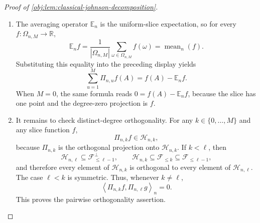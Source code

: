 \begin{proof}[Proof of \cref{obj:lem:classical-johnson-decomposition}]
\begin{enumerate}
\item The averaging operator \(\mathbb E_n\) is the uniform-slice expectation, so for every \(f:\Omega_{n,M}\to\mathbb R\),
\[
\mathbb E_n f
=
\frac{1}{|\Omega_{n,M}|}\sum_{\omega\in\Omega_{n,M}}f(\omega)
=
\operatorname{mean}_n(f).
\]
Substituting this equality into the preceding display yields
\[
\sum_{u=1}^{M}\Pi_{n,u}f(A)
=
f(A)-\mathbb E_n f .
\]
When \(M=0\), the same formula reads \(0=f(A)-\mathbb E_n f\), because the slice has one point and the degree-zero projection is \(f\). %

\item It remains to check distinct-degree orthogonality. For any \(k\in\{0,\ldots,M\}\) and any slice function \(f\),
\[
\Pi_{n,k}f\in\mathcal H_{n,k},
\]
because \(\Pi_{n,k}\) is the orthogonal projection onto \(\mathcal H_{n,k}\). If \(k<\ell\), then
\[
\mathcal H_{n,\ell}\subseteq \mathcal F_{\le \ell-1}^{\perp},
\qquad
\mathcal H_{n,k}\subseteq \mathcal F_{\le k}\subseteq \mathcal F_{\le \ell-1},
\]
and therefore every element of \(\mathcal H_{n,k}\) is orthogonal to every element of \(\mathcal H_{n,\ell}\). The case \(\ell<k\) is symmetric. Thus, whenever \(k\ne \ell\),
\[
\left\langle \Pi_{n,k}f,\Pi_{n,\ell}g\right\rangle_n=0 .
\]
This proves the pairwise orthogonality assertion. %
\end{enumerate}
\end{proof}
